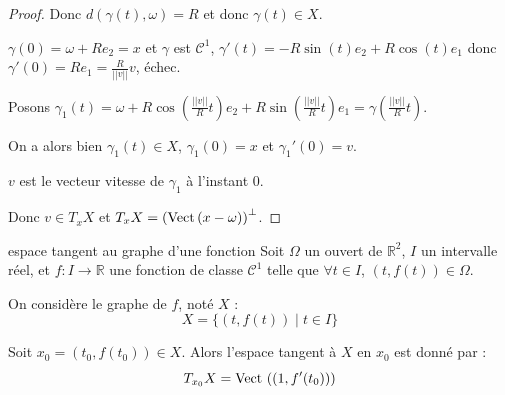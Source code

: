 \begin{proof}
    Donc $d(\gamma(t), \omega) = R$ et donc $\gamma(t) \in X$.

    $\gamma(0) = \omega + R e_2 = x$ et $\gamma$ est $\mathscr C^1$, $\gamma'(t) = -R \sin(t) e_2 + R \cos(t) e_1$ donc
    $\gamma'(0) = R e_1 = \frac{R}{||v||} v$, échec. 

    Posons $\gamma_1(t) = \omega + R \cos\left( \frac{||v||}{R} t \right) e_2 + R \sin\left( \frac{||v||}{R} t \right) e_1 = \gamma\left( \frac{||v||}{R} t \right)$.

    On a alors bien $\gamma_1(t) \in X$, $\gamma_1(0) = x$ et 
    $\gamma_1'(0) = v$.

    $v$ est le vecteur vitesse de $\gamma_1$ à l'instant $0$. 

    Donc $v \in T_xX$ et $T_xX = \left( \operatorname{Vect} \,(x - \omega) \right)^\perp$.
\end{proof}


\begin{proposition}{espace tangent au graphe d'une fonction}{}
    Soit $\Omega$ un ouvert de $\mathbb{R}^2$, $I$ un intervalle réel, et $f : I \to \mathbb{R}$ une fonction de classe $\mathscr{C}^1$ telle que $\forall t \in I$, $(t, f(t)) \in \Omega$.
    
    On considère le graphe de $f$, noté $X$ :
    \[
        X = \{(t, f(t)) \mid t \in I\}
    \]
    
    Soit $x_0 = (t_0, f(t_0)) \in X$. Alors l'espace tangent à $X$ en $x_0$ est donné par :
    \[
        T_{x_0}X = \operatorname{Vect} \,\left( (1, f'(t_0)) \right)
    \]
\end{proposition}

